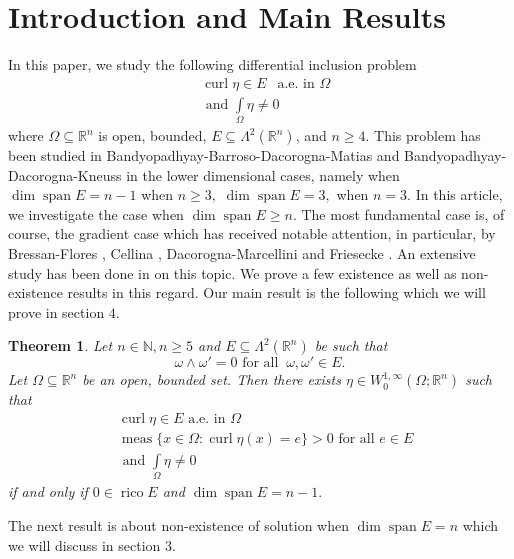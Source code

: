\documentclass[11pt, a4paper, reqno]{amsart}
\numberwithin{equation}{section}
\newcommand{\spann}{\operatorname{span}}
\newcommand{\meas}{\operatorname{meas}}
\newcommand{\curl}{\operatorname{curl}}
\newcommand{\rico}{\operatorname{rico}}
\newtheorem{theorem}{Theorem}[section]
\begin{document}
\section{Introduction and Main Results}
In this paper, we study the following differential inclusion problem 
\begin{equation}
\begin{aligned}
&\curl \eta \in E \ \ \textrm{ a.e. in } \Omega\\
&\textrm{ and } \int\limits_\Omega \eta \neq 0
\end{aligned}
\end{equation}\label{introeq1}
where $\Omega\subseteq \mathbb R^n$ is open, bounded,  $E\subseteq \Lambda^2(\mathbb R^n)$, and $n\geq 4$. This problem has been studied in Bandyopadhyay-Barroso-Dacorogna-Matias \cite{bandyopadhyay2007differential} and Bandyopadhyay-Dacorogna-Kneuss \cite{bandyopadhyay2015some} in the lower dimensional cases, namely when $\dim \spann E=n-1$ when $n\geq 3,$ $\dim \spann E=3,$ when $n=3.$ In this article, we investigate the case when $\dim \spann E\geq n.$ 
The most fundamental case is, of course, the gradient case which has received notable attention, in particular, by Bressan-Flores \cite{BressanFlores}, Cellina \cite{cellina1993minima,cellina1993minimanecessary}, Dacorogna-Marcellini \cite{DacorognaMarcellini} and Friesecke \cite{Friesecke}.  An extensive study has been done in \cite{dacorogna2005nonconvex} on this topic.
We prove a few  existence as well as non-existence results in this regard. Our main result is the following which we will prove in section $4.$
\begin{theorem}
    Let $n\in \mathbb N, n\geq 5$ and $E\subseteq \Lambda^2(\mathbb R^n)$ be such that $$\omega \wedge \omega'=0 \textrm{ for all }\ \omega ,\omega'\in E.$$
    Let $\Omega \subseteq \mathbb R^n$ be  an open, bounded set.  Then there exists $\eta \in W_0^{1,\infty}(\Omega;\mathbb R^n)$ such that
    \begin{align} \label{16/12/2022 1`}
     & \curl \eta \in E \textrm{ a.e. in } \Omega  \nonumber \\
      & \meas\{x\in \Omega : \curl \eta (x)=e\}>0 \textrm{ for all } e\in E\\
      & \textrm{ and } \int\limits_{\Omega}\eta \neq 0 \nonumber
     \end{align}
     if and only if $0\in \rico E$ and $\dim \spann E=n-1.$
\end{theorem}
The next result is about  non-existence of solution when $\dim \spann E=n$ which we will discuss in section $3.$
\end{document}
